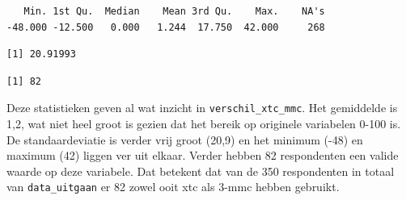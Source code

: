 \documentclass[
  letterpaper,
  DIV=11,
  numbers=noendperiod]{scrreprt}
\newenvironment{Shaded}{\begin{snugshade}}{\end{snugshade}}
\newcommand{\AttributeTok}[1]{\textcolor[rgb]{0.40,0.45,0.13}{#1}}
\newcommand{\CommentTok}[1]{\textcolor[rgb]{0.37,0.37,0.37}{#1}}
\newcommand{\ConstantTok}[1]{\textcolor[rgb]{0.56,0.35,0.01}{#1}}
\newcommand{\FunctionTok}[1]{\textcolor[rgb]{0.28,0.35,0.67}{#1}}
\newcommand{\NormalTok}[1]{\textcolor[rgb]{0.00,0.23,0.31}{#1}}
\newcommand{\OtherTok}[1]{\textcolor[rgb]{0.00,0.23,0.31}{#1}}
\newcommand{\SpecialCharTok}[1]{\textcolor[rgb]{0.37,0.37,0.37}{#1}}
\begin{document}
\begin{Shaded}
\end{Shaded}

\begin{verbatim}
   Min. 1st Qu.  Median    Mean 3rd Qu.    Max.    NA's 
-48.000 -12.500   0.000   1.244  17.750  42.000     268 
\end{verbatim}

\begin{Shaded}
\end{Shaded}

\begin{verbatim}
[1] 20.91993
\end{verbatim}

\begin{Shaded}
\end{Shaded}

\begin{verbatim}
[1] 82
\end{verbatim}

Deze statistieken geven al wat inzicht in \texttt{verschil\_xtc\_mmc}.
Het gemiddelde is 1,2, wat niet heel groot is gezien dat het bereik op
originele variabelen 0-100 is. De standaardeviatie is verder vrij groot
(20,9) en het minimum (-48) en maximum (42) liggen ver uit elkaar.
Verder hebben 82 respondenten een valide waarde op deze variabele. Dat
betekent dat van de 350 respondenten in totaal van
\texttt{data\_uitgaan} er 82 zowel ooit xtc als 3-mmc hebben gebruikt.
\end{document}

